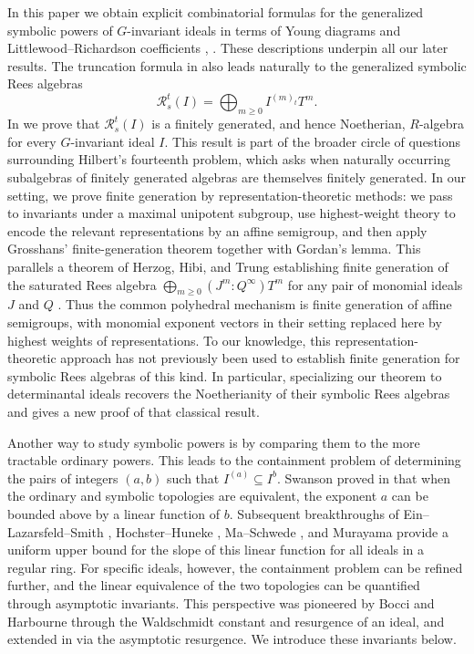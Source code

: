 \documentclass[11pt, reqno]{amsart}
\numberwithin{equation}{section}
\theoremstyle{definition}
\begin{document}
In this paper we obtain explicit combinatorial formulas for the generalized symbolic powers of $G$-invariant ideals in terms of Young diagrams and Littlewood--Richardson coefficients , . These descriptions underpin all our later results. The truncation formula in   also leads naturally to the generalized symbolic Rees algebras
 \[ \mathcal R_s^t(I)=\bigoplus_{m\geq0} I^{(m)_t}T^m. \]
 In  we prove that $\mathcal R_s^t(I)$ is a finitely generated, and hence Noetherian, $R$-algebra for every $G$-invariant ideal $I$.  This result is part of the broader circle of questions surrounding Hilbert's fourteenth problem, which asks when naturally occurring subalgebras of finitely generated algebras are themselves finitely generated.  In our setting, we prove finite generation by representation-theoretic methods: we pass to invariants under a maximal unipotent subgroup, use highest-weight theory  to encode the relevant representations by an affine semigroup, and then apply Grosshans' finite-generation theorem together with Gordan's lemma. This parallels a theorem of Herzog, Hibi, and Trung establishing finite generation of the saturated Rees algebra $\bigoplus_{m\geq0}(J^m:Q^\infty)T^m$ for any pair of monomial ideals $J$ and $Q$ \cite[Theorem~3.2]{herzog2007}. Thus the common polyhedral mechanism is finite generation of affine semigroups, with monomial exponent vectors in their setting replaced here by highest weights of representations. To our knowledge, this representation-theoretic approach has not previously been used to establish finite generation for symbolic Rees algebras of this kind. In particular, specializing our theorem to determinantal ideals recovers the Noetherianity of their symbolic Rees algebras and gives a new proof of that classical result.

Another way to study symbolic powers is by comparing them to the more tractable ordinary powers. This leads to the containment problem of determining the pairs of integers $(a,b)$ such that $I^{(a)}\subseteq I^b$. Swanson proved in \cite{Swanson} that when the ordinary and symbolic topologies are equivalent, the exponent $a$ can be bounded above by a linear function of $b$. Subsequent breakthroughs of Ein--Lazarsfeld--Smith \cite{ELS}, Hochster--Huneke \cite{comparison}, Ma--Schwede \cite{MaSchwede}, and Murayama \cite{Murayama2021UniformBounds} provide a uniform upper bound for the slope of this linear function for all ideals in a regular ring. For specific ideals, however, the containment problem can be refined further, and the linear equivalence of the two topologies can be quantified through asymptotic invariants. This perspective was pioneered by Bocci and Harbourne \cite{BocciHarbournecomparing, BocciHarbourneresurgence} through the Waldschmidt constant and resurgence of an ideal, and extended in \cite{guardo2013asymptotic} via the asymptotic resurgence. We introduce these invariants below.
\end{document}
